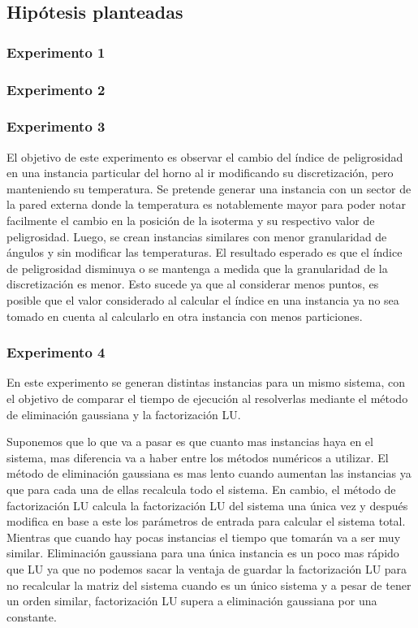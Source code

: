   \subsection{Hipótesis planteadas}

  	\subsubsection*{Experimento 1}

  	\subsubsection*{Experimento 2}

  	\subsubsection*{Experimento 3}
  		El objetivo de este experimento es observar el cambio del índice de peligrosidad en una instancia particular del horno al ir modificando su discretización, pero manteniendo su temperatura. 
  		Se pretende generar una instancia con un sector de la pared externa donde la temperatura es notablemente mayor para poder notar facilmente el cambio en la posición de la isoterma y su respectivo valor de peligrosidad. Luego, se crean instancias similares con menor granularidad de ángulos y sin modificar las temperaturas. El resultado esperado es que el índice de peligrosidad disminuya o se mantenga a medida que la granularidad de la discretización es menor. Esto sucede ya que al considerar menos puntos, es posible que el valor considerado al calcular el índice en una instancia ya no sea tomado en cuenta al calcularlo en otra instancia con menos particiones.

  	\subsubsection*{Experimento 4}
  		En este experimento se generan distintas instancias para un mismo sistema, con el objetivo de comparar el tiempo de ejecución al resolverlas mediante el método de eliminación gaussiana y la factorización LU. 
  		
  		
    	Suponemos que lo que va a pasar es que cuanto mas instancias haya en el sistema, mas diferencia va a haber entre los métodos numéricos a utilizar. El método de eliminación gaussiana es mas lento cuando aumentan las instancias ya que para cada una de ellas recalcula todo el sistema. En cambio, el método de factorización LU calcula la factorización LU del sistema una única vez y después modifica en base a este los parámetros de entrada para calcular el sistema total. Mientras que cuando hay pocas instancias el tiempo que tomarán va a ser muy similar. Eliminación gaussiana para una única instancia es un poco mas rápido que LU ya que no podemos sacar la ventaja de guardar la factorización LU para no recalcular la matriz del sistema cuando es un único sistema y a pesar de tener un orden similar, factorización LU supera a eliminación gaussiana por una constante.

